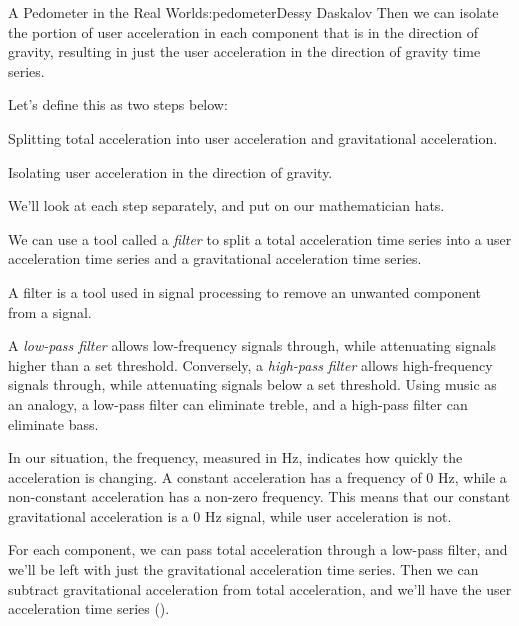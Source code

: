 \begin{aosachapter}{A Pedometer in the Real World}{s:pedometer}{Dessy Daskalov}
Then we can isolate the portion of user acceleration in each component
that is in the direction of gravity, resulting in just the user
acceleration in the direction of gravity time series.

Let's define this as two steps below:

\begin{aosaenumerate}
\def\labelenumi{\arabic{enumi}.}

\item
  Splitting total acceleration into user acceleration and gravitational
  acceleration.
\item
  Isolating user acceleration in the direction of gravity.
\end{aosaenumerate}

We'll look at each step separately, and put on our mathematician hats.

\label{splitting-total-acceleration-into-user-acceleration-and-gravitational-acceleration}

We can use a tool called a \emph{filter} to split a total acceleration
time series into a user acceleration time series and a gravitational
acceleration time series.

\label{low-pass-and-high-pass-filters}

A filter is a tool used in signal processing to remove an unwanted
component from a signal.

A \emph{low-pass filter} allows low-frequency signals through, while
attenuating signals higher than a set threshold. Conversely, a
\emph{high-pass filter} allows high-frequency signals through, while
attenuating signals below a set threshold. Using music as an analogy, a
low-pass filter can eliminate treble, and a high-pass filter can
eliminate bass.

In our situation, the frequency, measured in Hz, indicates how quickly
the acceleration is changing. A constant acceleration has a frequency of
0 Hz, while a non-constant acceleration has a non-zero frequency. This
means that our constant gravitational acceleration is a 0 Hz signal,
while user acceleration is not.

For each component, we can pass total acceleration through a low-pass
filter, and we'll be left with just the gravitational acceleration time
series. Then we can subtract gravitational acceleration from total
acceleration, and we'll have the user acceleration time series
().


\end{aosachapter}
